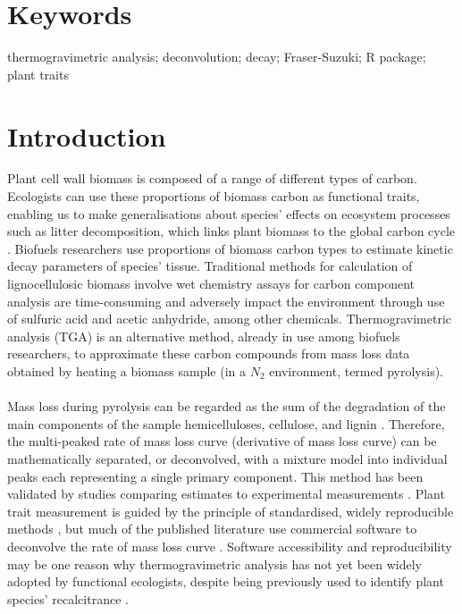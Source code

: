 \documentclass{jors}\usepackage[]{graphicx}\usepackage[]{color}
\begin{document}
\section*{Keywords}
thermogravimetric analysis; deconvolution; decay; Fraser-Suzuki; R package; plant traits

\section*{Introduction}
Plant cell wall biomass is composed of a range of different types of carbon. Ecologists can use these proportions of biomass carbon as functional traits, enabling us to make generalisations about species' effects on ecosystem processes such as litter decomposition, which links plant biomass to the global carbon cycle \citep{cornwell2008}. Biofuels researchers use proportions of biomass carbon types to estimate kinetic decay parameters of species' tissue. Traditional methods for calculation of lignocellulosic biomass involve wet chemistry assays for carbon component analysis are time-consuming and adversely impact the environment through use of sulfuric acid and acetic anhydride, among other chemicals. Thermogravimetric analysis (TGA) is an alternative method, already in use among biofuels researchers, to approximate these carbon compounds from mass loss data obtained by heating a biomass sample (in a $N_2$ environment, termed pyrolysis). \\
\\
Mass loss during pyrolysis can be regarded as the sum of the degradation of the main components of the sample \textemdash hemicelluloses, cellulose, and lignin \citep{hu2016,cheng2015,perejon2011,orfao2001,muller-hagedorn2007}. Therefore, the multi-peaked rate of mass loss curve (derivative of mass loss curve) can be mathematically separated, or deconvolved, with a mixture model into individual peaks \textemdash each representing a single primary component. This method has been validated by studies comparing estimates to experimental measurements \citep{yang2006}. Plant trait measurement is guided by the principle of standardised, widely reproducible methods \citep{perez-harguindeguy2013}, but much of the published literature use commercial software to deconvolve the rate of mass loss curve \citetext{for example OriginPro \citealp{chen2017}, PeakFit \citealp{perejon2011}, Fityk \citealp{perejon2011}, or Datafit \citealp{cheng2015}}. Software accessibility and reproducibility may be one reason why thermogravimetric analysis has not yet been widely adopted by functional ecologists, despite being previously used to identify plant species' recalcitrance \citetext{for example in marine and coastal macrophytes \citealp{trevathan-tackett2015}, and eucaplyts \citealp{orfao2001}}. \\
\end{document}
